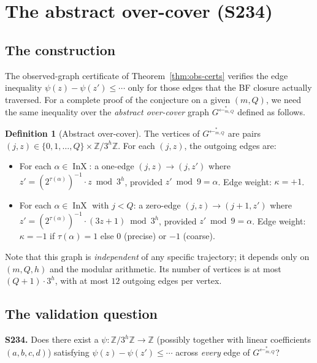 \documentclass[11pt,a4paper]{article}
\theoremstyle{plain}
\theoremstyle{definition}
\newtheorem{definition}[theorem]{Definition}
\newcommand{\ZZ}{\mathbb{Z}}
\newcommand{\InvG}{G^{\!\leftarrow}}
\DeclareMathOperator{\InX}{InX}
\begin{document}
\section{The abstract over-cover (S234)}\label{sec:s234}

\subsection{The construction}

The observed-graph certificate of Theorem~\ref{thm:obs-certs}
verifies the edge inequality $\psi(z) - \psi(z') \le \cdots$ only
for those edges that the BF closure actually traversed. For a
complete proof of the conjecture on a given $(m, Q)$, we need
the same inequality over the
\emph{abstract over-cover} graph $\InvG^{*}_{m, Q}$ defined as
follows.

\begin{definition}[Abstract over-cover]
\label{def:over-cover}
The vertices of $\InvG^{*}_{m, Q}$ are pairs
\(
   (j, z) \in \{0, 1, \dots, Q\} \times \ZZ/3^h\ZZ.
\)
For each $(j, z)$, the outgoing edges are:
\begin{itemize}
  \item For each $\alpha \in \InX$: a one-edge
        $(j, z) \to (j, z')$ where
        $z' = (2^{\tau(\alpha)})^{-1} \cdot z \bmod 3^h$,
        provided $z' \bmod 9 = \alpha$.
        Edge weight: $\kappa = +1$.
  \item For each $\alpha \in \InX$ with $j < Q$: a zero-edge
        $(j, z) \to (j + 1, z')$ where
        $z' = (2^{\tau(\alpha)})^{-1} \cdot (3 z + 1) \bmod 3^h$,
        provided $z' \bmod 9 = \alpha$.
        Edge weight: $\kappa = -1$ if $\tau(\alpha) = 1$ else $0$
        (precise) or $-1$ (coarse).
\end{itemize}
\end{definition}

Note that this graph is \emph{independent} of any specific
trajectory; it depends only on $(m, Q, h)$ and the modular
arithmetic. Its number of vertices is at most
$(Q + 1) \cdot 3^h$, with at most $12$ outgoing edges per vertex.

\subsection{The validation question}

\textbf{S234.} Does there exist a $\psi : \ZZ/3^h\ZZ \to \ZZ$
(possibly together with linear coefficients $(a, b, c, d)$)
satisfying $\psi(z) - \psi(z') \le \cdots$ across \emph{every}
edge of $\InvG^{*}_{m, Q}$?
\end{document}
